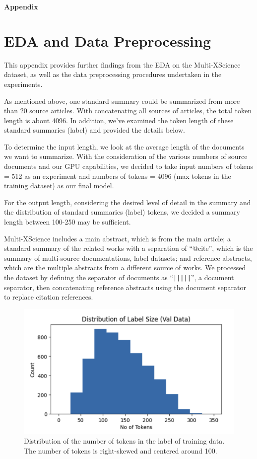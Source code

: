 \documentclass[12pt, twocolumn]{article}
\numberwithin{equation}{section}
\begin{document}
\newpage
\textbf{\Huge Appendix}
\appendix

\section{EDA and Data Preprocessing}
\label{app:eda}

This appendix provides further findings from the EDA on the Multi-XScience dataset, as well as the data preprocessing procedures undertaken in the experiments.

As mentioned above, one standard summary could be summarized from more than 20 source articles.  With concatenating all sources of articles, the total token length is about 4096. In addition, we've examined the token length of these standard summaries (label) and provided the details below. 

To determine the input length, we look at the average length of the documents we want to summarize. With the consideration of the various numbers of source documents and our GPU capabilities, we decided to take input numbers of tokens = 512 as an experiment and numbers of tokens = 4096 (max tokens in the training dataset) as our final model. 

For the output length, considering the desired level of detail in the summary and the distribution of standard summaries (label) tokens, we decided a summary length between 100-250 may be sufficient. 

Multi-XScience includes a main abstract, which is from the main article; a standard summary of the related works with a separation of ``@cite'', which is the summary of multi-source documentations, label datasets; and reference abstracts, which are the multiple abstracts from a different source of works. We processed the dataset by defining the separator of documents as ``\texttt{|||||}'', a document separator, then concatenating reference abstracts using the document separator to replace citation references. 

\begin{figure}
    \includegraphics[width=\textwidth]{label_dist.png}
    \caption{Distribution of the number of tokens in the label of training data. The number of tokens is right-skewed and centered around 100.}
    \label{fig:label-dist}
\end{figure}
\end{document}
